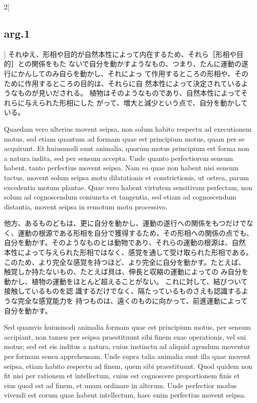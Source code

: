 \documentclass[paper=a4paper,fontsize=10pt,jafontsize=9pt,titlepage]{jlreq}
\begin{document}
\begin{paracol}{2}[\subsection{arg.1}]
それゆえ、形相や目的が自然本性によって内在するため、それら［形相や目的］との関係をもた
 ないで自分を動かすようなもの、つまり、たんに運動の遂行にかんしてのみ自らを動かし、それによっ
 て作用するところの形相や、そのために作用するところの目的は、それらに自
 然本性によって決定されているようなものが見いだされる。
植物はそのようなものであり、自然本性によってそれらに与えられた形相にした
 がって、増大と減少という点で、自分を動かしている。

\switchcolumn*


Quaedam vero ulterius
movent seipsa, non solum habito respectu ad executionem motus, sed etiam
quantum ad formam quae est principium motus, quam per se acquirunt. Et
huiusmodi sunt animalia, quorum motus principium est forma non a natura
indita, sed per sensum accepta. Unde quanto perfectiorem sensum habent,
tanto perfectius movent seipsa. Nam ea quae non habent nisi sensum
tactus, movent solum seipsa motu dilatationis et constrictionis, ut
ostrea, parum excedentia motum plantae. Quae vero habent virtutem
sensitivam perfectam, non solum ad cognoscendum coniuncta et tangentia,
sed etiam ad cognoscendum distantia, movent seipsa in remotum motu
processivo.

\switchcolumn

他方、あるものどもは、更に自分を動かし、運動の遂行への関係をもつだけでな
 く、運動の根源である形相を自分で獲得するため、その形相への関係の点でも、
 自分を動かす。そのようなものとは動物であり、それらの運動の根源は、自然
 本性によって与えられた形相ではなく、感覚を通して受け取られた形相である。
 このため、より完全な感覚を持つほど、より完全に自分を動かす。たとえば、
 触覚しか持たないもの、たとえば貝は、伸長と収縮の運動によっての
 み自分を動かし、植物の運動をほとんど超えることがない。
これに対して、結びついて接触しているものを認
 識するだけでなく、隔たっているものさえも認識するような完全な感覚能力を
 持つものは、遠くのものに向かって、前進運動によって自分を動かす。

\switchcolumn*


Sed quamvis huiusmodi animalia formam quae est principium
motus, per sensum accipiant, non tamen per seipsa praestituunt sibi
finem suae operationis, vel sui motus; sed est eis inditus a natura,
cuius instinctu ad aliquid agendum moventur per formam sensu
apprehensam. Unde supra talia animalia sunt illa quae movent seipsa,
etiam habito respectu ad finem, quem sibi praestituunt. Quod quidem non
fit nisi per rationem et intellectum, cuius est cognoscere proportionem
finis et eius quod est ad finem, et unum ordinare in alterum. Unde
perfectior modus vivendi est eorum quae habent intellectum, haec enim
perfectius movent seipsa.


\end{paracol}
\end{document}
